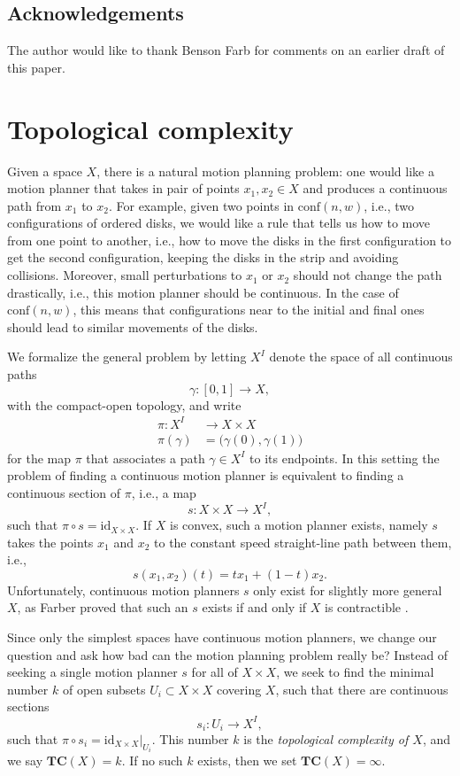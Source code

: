 \subsection{Acknowledgements}
The author would like to thank Benson Farb for comments on an earlier draft of this paper.

\section{Topological complexity}
Given a space $X$, there is a natural motion planning problem: one would like a motion planner that takes in pair of points $x_{1}, x_{2}\in X$ and produces a continuous path from $x_{1}$ to $x_{2}$.
For example, given two points in $\text{conf}(n,w)$, i.e., two configurations of ordered disks, we would like a rule that tells us how to move from one point to another, i.e., how to move the disks in the first configuration to get the second configuration, keeping the disks in the strip and avoiding collisions.
Moreover, small perturbations to $x_{1}$ or $x_{2}$ should not change the path drastically, i.e., this motion planner should be continuous.
In the case of $\text{conf}(n,w)$, this means that configurations near to the initial and final ones should lead to similar movements of the disks.

We formalize the general problem by letting $X^{I}$ denote the space of all continuous paths 
\[
\gamma:[0,1]\to X,
\]
with the compact-open topology, and write
\begin{align*}
\pi:X^{I}&\to X\times X\\
\pi(\gamma)&=\big(\gamma(0), \gamma(1)\big)
\end{align*}
for the map $\pi$ that associates a path $\gamma\in X^{I}$ to its endpoints.
In this setting the problem of finding a continuous motion planner is equivalent to finding a continuous section of $\pi$, i.e., a map
\[
s:X\times X\to X^{I},
\]
such that $\pi\circ s=\text{id}_{X\times X}$.
If $X$ is convex, such a motion planner exists, namely $s$ takes the points $x_{1}$ and $x_{2}$ to the constant speed straight-line path between them, i.e.,
\[
s(x_{1}, x_{2})(t)=tx_{1}+(1-t)x_{2}.
\]
Unfortunately, continuous motion planners $s$ only exist for slightly more general $X$, as Farber proved that such an $s$ exists if and only if $X$ is contractible \cite[Theorem 1]{farber2003topological}.

Since only the simplest spaces have continuous motion planners, we change our question and ask how bad can the motion planning problem really be?
Instead of seeking a single motion planner $s$ for all of $X\times X$, we seek to find the minimal number $k$ of open subsets $U_{i}\subset X\times X$ covering $X$, such that there are continuous sections
\[
s_{i}:U_{i}\to X^{I},
\]
such that $\pi\circ s_{i}=\text{id}_{X\times X}|_{U_{i}}$.
This number $k$ is the \emph{topological complexity of $X$}, and we say $\textbf{TC}(X)=k$.
If no such $k$ exists, then we set $\textbf{TC}(X)=\infty$.

